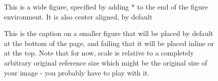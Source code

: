 \begin{figure}[]
    \noindent
    \caption{This is a wide figure, specified by adding * to the end of
    the figure environment. It is also center
    aligned, by default}
\end{figure}

\begin{figure}[bht]
    \noindent
    \caption{This is the caption on a smaller figure that will be placed by default at the
    bottom of the page, and failing that it will be placed inline or at the top.
    Note that for now, scale is relative to a completely arbitrary original
    reference size which might be the original size of your image - you probably
    have to play with it. \label{egfig2}}
\end{figure}

